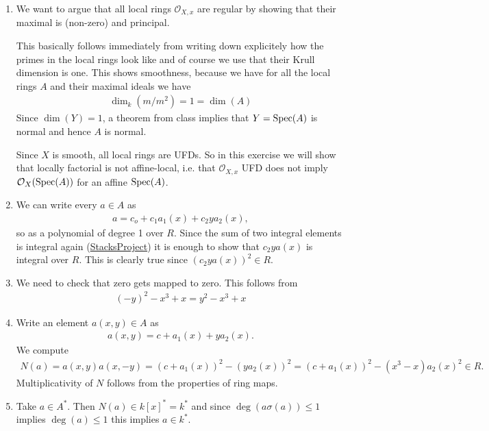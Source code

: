 \newcommand{\sheet}{12}




\maketitle{}

\begin{exercise}{3}
    \begin{enumerate}
        \item We want to argue that all local rings $\mathcal{O}_{X,x}$ are regular by showing that their maximal is (non-zero)
        and principal.

        This basically follows immediately from writing down explicitely how the primes in the local rings look like and of course
        we use that their Krull dimension is one. This shows smoothness, because we have for all the local rings $A$ and their
         maximal ideals we have
        \begin{align*}
            \dim_k(m/m^2)=1=\dim(A)
        \end{align*}
        Since $\dim(Y)=1$, a theorem from class implies that $Y=\operatorname{Spec}(A)$ is normal and hence $A$ is normal.

        Since $X$ is smooth, all local rings are UFDs. So in this exercise we will show that locally factorial is not affine-local, i.e.
        that $\mathcal{O}_{X,x}$ UFD does not imply $\mathcal{O}_X(\operatorname{Spec}(A))$ for an affine $\operatorname{Spec}(A)$.
        \item We can write every $a\in A$ as 
        \begin{align*}
            a=c_o+c_1a_1(x)+c_2ya_2(x),
        \end{align*}
        so as a polynomial of degree 1 over $R$. Since the sum of two integral elements is integral again (\href{https://stacks.math.columbia.edu/tag/00GO}{StacksProject})
        it is enough to show that $c_2ya(x)$ is integral over $R$. This is clearly true since $(c_2ya(x))^2\in R$.
        \item We need to check that zero gets mapped to zero. This follows from
        \begin{align*}
            (-y)^2-x^3+x=y^2-x^3+x
        \end{align*}
        \item Write an element $a(x,y)\in A$ as 
        \begin{align*}
            a(x,y)=c+a_1(x)+ya_2(x).
        \end{align*}
        We compute 
        \begin{align*}
            N(a)=a(x,y)a(x,-y)=(c+a_1(x))^2-(ya_2(x))^2=(c+a_1(x))^2-(x^3-x)a_2(x)^2\in R.
        \end{align*}
        Multiplicativity of $N$ follows from the properties of ring maps.
        \item Take $a\in A^*$. Then $N(a)\in k[x]^*=k^*$ and since $\deg(a\sigma(a))\leq 1$ implies $\deg(a)\leq 1$ this implies $a\in k^*$.


\end{enumerate}
\end{exercise}

